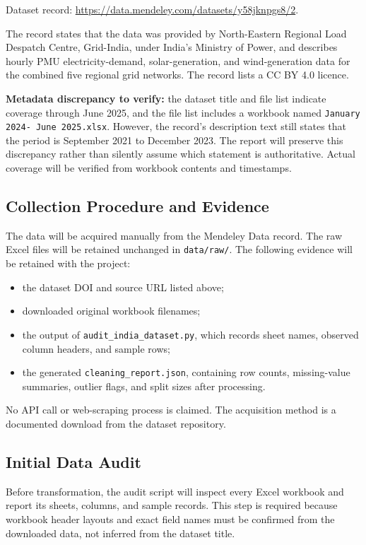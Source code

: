 \documentclass[12pt,a4paper]{article}
\begin{document}
Dataset record: \url{https://data.mendeley.com/datasets/y58jknpgs8/2}.

The record states that the data was provided by North-Eastern Regional Load Despatch Centre, Grid-India, under India's Ministry of Power, and describes hourly PMU electricity-demand, solar-generation, and wind-generation data for the combined five regional grid networks. The record lists a CC BY 4.0 licence.

\textbf{Metadata discrepancy to verify:} the dataset title and file list indicate coverage through June 2025, and the file list includes a workbook named \texttt{January 2024- June 2025.xlsx}. However, the record's description text still states that the period is September 2021 to December 2023. The report will preserve this discrepancy rather than silently assume which statement is authoritative. Actual coverage will be verified from workbook contents and timestamps.

\subsection{Collection Procedure and Evidence}
The data will be acquired manually from the Mendeley Data record. The raw Excel files will be retained unchanged in \texttt{data/raw/}. The following evidence will be retained with the project:
\begin{itemize}[leftmargin=*]
  \item the dataset DOI and source URL listed above;
  \item downloaded original workbook filenames;
  \item the output of \texttt{audit\_india\_dataset.py}, which records sheet names, observed column headers, and sample rows;
  \item the generated \texttt{cleaning\_report.json}, containing row counts, missing-value summaries, outlier flags, and split sizes after processing.
\end{itemize}
No API call or web-scraping process is claimed. The acquisition method is a documented download from the dataset repository.

\subsection{Initial Data Audit}
Before transformation, the audit script will inspect every Excel workbook and report its sheets, columns, and sample records. This step is required because workbook header layouts and exact field names must be confirmed from the downloaded data, not inferred from the dataset title.
\end{document}
